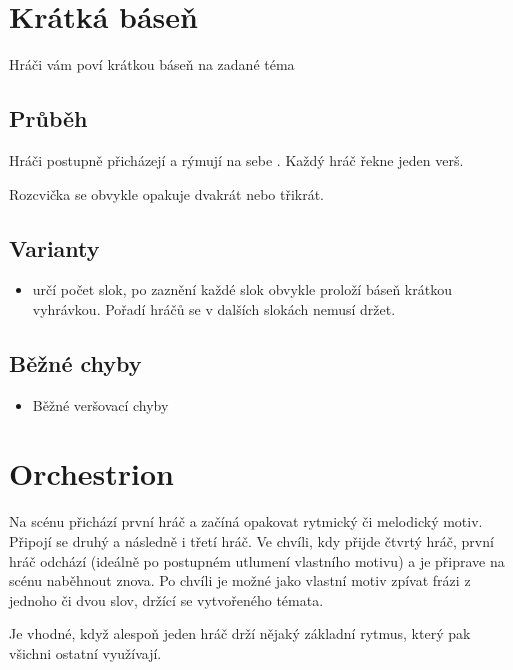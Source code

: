  
 
 
 
 
\needspace{5cm} \section{Krátká báseň} \label{krátká báseň}  
 
 
Hráči vám poví krátkou báseň na zadané téma 
 
 
\subsection{ Průběh } Hráči postupně přicházejí a rýmují na sebe . 
Každý hráč řekne jeden verš.  
 
Rozcvička se obvykle opakuje dvakrát nebo třikrát. 
\subsection{ Varianty } \begin{itemize}
\item  {} určí počet slok, po zaznění každé slok obvykle  proloží báseň krátkou vyhrávkou. Pořadí hráčů se v dalších slokách nemusí držet.
\end{itemize}
 
\subsection{ Běžné chyby } \begin{itemize}
\item  Běžné veršovací chyby
\end{itemize}
 
 
 
 
\needspace{5cm} \section{Orchestrion} \label{orchestrion} Na scénu přichází první hráč a začíná opakovat rytmický či melodický motiv. Připojí se druhý a následně i třetí hráč. Ve chvíli, kdy přijde čtvrtý hráč, první hráč odchází (ideálně po postupném utlumení vlastního motivu) a je připrave na scénu naběhnout znova. 
Po chvíli je možné jako vlastní motiv zpívat frázi z jednoho či dvou slov, držící se vytvořeného témata. 
 
Je vhodné, když alespoň jeden hráč drží nějaký základní rytmus, který pak všichni ostatní využívají. 
 
